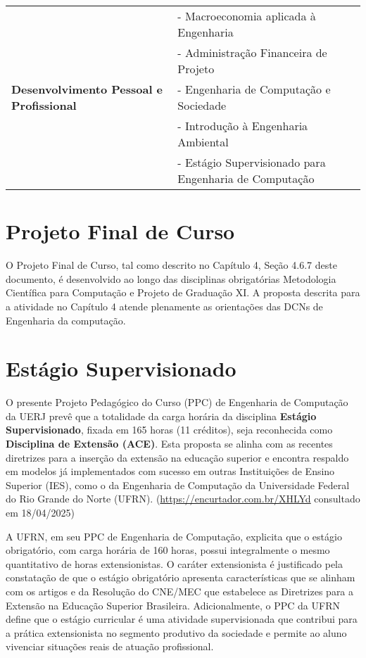 \begin{table}[ht]
\begin{tabular}{l l}
                                & - Macroeconomia aplicada à Engenharia                  \\

                                & - Administração Financeira de Projeto                  \\

        \hline

        \textbf{Desenvolvimento Pessoal e Profissional}
                                & - Engenharia de Computação e Sociedade                 \\

                                & - Introdução à Engenharia Ambiental                    \\

                                & - Estágio Supervisionado para Engenharia de Computação \\

        \hline
    \end{tabular}
\end{table}


\section{Projeto Final de Curso}
O Projeto Final de Curso, tal como descrito no Capítulo 4, Seção 4.6.7 deste documento, é
desenvolvido ao longo das disciplinas obrigatórias Metodologia Científica para Computação e Projeto de Graduação XI. A proposta descrita para a atividade no Capítulo 4 atende plenamente as orientações das DCNs de Engenharia da computação.

\section{Estágio Supervisionado}
O presente Projeto Pedagógico do Curso (PPC) de Engenharia de Computação da UERJ prevê que a totalidade da carga horária da disciplina \textbf{Estágio Supervisionado}, fixada em 165 horas (11 créditos), seja reconhecida como \textbf{Disciplina de Extensão (ACE)}. Esta proposta se alinha com as recentes diretrizes para a inserção da extensão na educação superior e encontra respaldo em modelos já implementados com sucesso em outras Instituições de Ensino Superior (IES), como o da Engenharia de Computação da Universidade Federal do Rio Grande do Norte (UFRN). (\url{https://encurtador.com.br/XHLYd} consultado em 18/04/2025)

A UFRN, em seu PPC de Engenharia de Computação, explicita que o estágio obrigatório, com carga horária de 160 horas, possui integralmente o mesmo quantitativo de horas extensionistas. O caráter extensionista é justificado pela constatação de que o estágio obrigatório apresenta características que se alinham com os artigos  e  da Resolução do CNE/MEC que estabelece as Diretrizes para a Extensão na Educação Superior Brasileira. Adicionalmente, o PPC da UFRN define que o estágio curricular é uma atividade supervisionada que contribui para a prática extensionista no segmento produtivo da sociedade e permite ao aluno vivenciar situações reais de atuação profissional.

